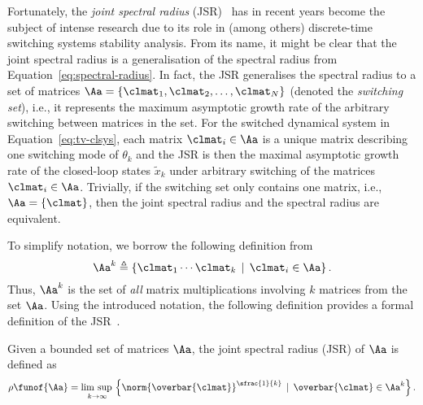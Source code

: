 Fortunately, the \emph{joint spectral radius} (JSR)~\cite{Rota:1960} has in recent years become the subject of intense research due to its role in (among others) discrete-time switching systems stability analysis.
From its name, it might be clear that the joint spectral radius is a generalisation of the spectral radius from Equation~\eqref{eq:spectral-radius}.
In fact, the JSR generalises the spectral radius to a set of matrices $\Aa = \left\{ \clmat_1, \clmat_2, \ldots, \clmat_N \right\}$ (denoted the \emph{switching set}), i.e., it represents the maximum asymptotic growth rate of the arbitrary switching between matrices in the set.
For the switched dynamical system in Equation~\eqref{eq:tv-clsys}, each matrix $\clmat_i \in \Aa$ is a unique matrix describing one switching mode of $\theta_k$ and the JSR is then the maximal asymptotic growth rate of the closed-loop states $\tilde{x}_k$ under arbitrary switching of the matrices $\clmat_i \in \Aa$.
Trivially, if the switching set only contains one matrix, i.e., $\Aa = \left\{ \clmat \right\}$, then the joint spectral radius and the spectral radius are equivalent.

To simplify notation, we borrow the following definition from~\cite{Jungers:2009}
%
\begin{equation*}
    \Aa^k \triangleq \left\{ \clmat_1 \cdots \clmat_k \,\mid\, \clmat_i \in \Aa \right\}.
\end{equation*}
%
Thus, $\Aa^k$ is the set of \emph{all} matrix multiplications involving $k$ matrices from the set $\Aa$.
Using the introduced notation, the following definition provides a formal definition of the JSR~\cite{Jungers:2009}.
%
\begin{definition}%
    \label{def:jsr}%
    Given a bounded set of matrices $\Aa$, the joint spectral radius (JSR) of $\Aa$ is defined as
    \begin{equation*}
        \rho\funof{\Aa} = \underset{k\rightarrow\infty}{\lim{}\sup{}} \left\{ \norm{\overbar{\clmat}}^{\sfrac{1}{k}} \,\mid\, \overbar{\clmat} \in \Aa^k \right\}.
    \end{equation*}
\end{definition}

